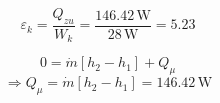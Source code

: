 

\item[d)] 
    \[
    \varepsilon_k = \frac{Q_{zu}}{W_k} = \frac{146.42 \, \text{W}}{28 \, \text{W}} = 5.23
    \]
    
    \item[EB (Fließprozess):] 
    \[
    0 = \dot{m} [h_2 - h_1] + Q_{\mu}
    \]
    \[
    \Rightarrow Q_{\mu} = \dot{m} [h_2 - h_1] = 146.42 \, \text{W}
    \]